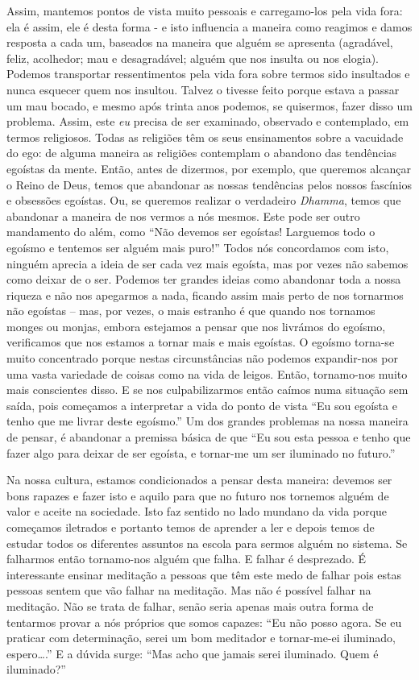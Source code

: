 Assim, mantemos pontos de vista muito pessoais e carregamo-los pela vida
fora: ela é assim, ele é desta forma - e isto influencia a maneira como
reagimos e damos resposta a cada um, baseados na maneira que alguém se
apresenta (agradável, feliz, acolhedor; mau e desagradável; alguém que
nos insulta ou nos elogia). Podemos transportar ressentimentos pela vida
fora sobre termos sido insultados e nunca esquecer quem nos insultou.
Talvez o tivesse feito porque estava a passar um mau bocado, e mesmo
após trinta anos podemos, se quisermos, fazer disso um problema. Assim,
este \emph{eu} precisa de ser examinado, observado e contemplado, em
termos religiosos. Todas as religiões têm os seus ensinamentos sobre a
vacuidade do ego: de alguma maneira as religiões contemplam o abandono
das tendências egoístas da mente. Então, antes de dizermos, por exemplo,
que queremos alcançar o Reino de Deus, temos que abandonar as nossas
tendências pelos nossos fascínios e obsessões egoístas. Ou, se queremos
realizar o verdadeiro \emph{Dhamma}, temos que abandonar a maneira de
nos vermos a nós mesmos. Este pode ser outro mandamento do além, como
``Não devemos ser egoístas! Larguemos todo o egoísmo e tentemos ser
alguém mais puro!'' Todos nós concordamos com isto, ninguém aprecia a
ideia de ser cada vez mais egoísta, mas por vezes não sabemos como
deixar de o ser. Podemos ter grandes ideias como abandonar toda a nossa
riqueza e não nos apegarmos a nada, ficando assim mais perto de nos
tornarmos não egoístas -- mas, por vezes, o mais estranho é que quando
nos tornamos monges ou monjas, embora estejamos a pensar que nos
livrámos do egoísmo, verificamos que nos estamos a tornar mais e mais
egoístas. O egoísmo torna-se muito concentrado porque nestas
circunstâncias não podemos expandir-nos por uma vasta variedade de
coisas como na vida de leigos. Então, tornamo-nos muito mais conscientes
disso. E se nos culpabilizarmos então caímos numa situação sem saída,
pois começamos a interpretar a vida do ponto de vista ``Eu sou egoísta e
tenho que me livrar deste egoísmo.'' Um dos grandes problemas na nossa
maneira de pensar, é abandonar a premissa básica de que ``Eu sou esta
pessoa e tenho que fazer algo para deixar de ser egoísta, e tornar-me um
ser iluminado no futuro.''

Na nossa cultura, estamos condicionados a pensar desta maneira: devemos
ser bons rapazes e fazer isto e aquilo para que no futuro nos tornemos
alguém de valor e aceite na sociedade. Isto faz sentido no lado mundano
da vida porque começamos iletrados e portanto temos de aprender a ler e
depois temos de estudar todos os diferentes assuntos na escola para
sermos alguém no sistema. Se falharmos então tornamo-nos alguém que
falha. E falhar é desprezado. É interessante ensinar meditação a pessoas
que têm este medo de falhar pois estas pessoas sentem que vão falhar na
meditação. Mas não é possível falhar na meditação. Não se trata de
falhar, senão seria apenas mais outra forma de tentarmos provar a nós
próprios que somos capazes: ``Eu não posso agora. Se eu praticar com
determinação, serei um bom meditador e tornar-me-ei iluminado,
espero\ldots{}.'' E a dúvida surge: ``Mas acho que jamais serei iluminado.
Quem é iluminado?''

